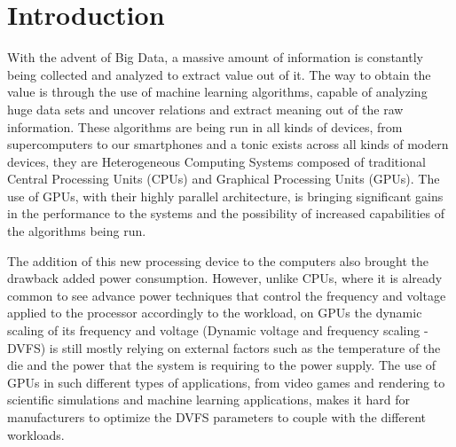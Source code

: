 
\chapter{Introduction}
\label{chapter:introduction}

With the advent of Big Data, a massive amount of information is constantly being collected and analyzed to extract value out of it. The way to obtain the value is through the use of machine learning algorithms, capable of analyzing huge data sets and uncover relations and extract meaning out of the raw information. These algorithms are being run in all kinds of devices, from supercomputers to our smartphones and a tonic exists across all kinds of modern devices, they are Heterogeneous Computing Systems composed of traditional Central Processing Units (CPUs) and Graphical Processing Units (GPUs). The use of GPUs, with their highly parallel architecture, is bringing significant gains in the performance to the systems and the possibility of increased capabilities of the algorithms being run. 

The addition of this new processing device to the computers also brought the drawback added power consumption. However, unlike CPUs, where it is already common to see advance power techniques that control the frequency and voltage applied to the processor accordingly to the workload, on GPUs the dynamic scaling  of its frequency and voltage (Dynamic voltage and frequency scaling - DVFS) is still mostly relying on external factors such as the temperature of the die and the power that the system is requiring to the power supply. The use of GPUs in such different types of applications, from video games and rendering to scientific simulations and machine learning applications, makes it hard for manufacturers to optimize the DVFS parameters to couple with the different workloads.

